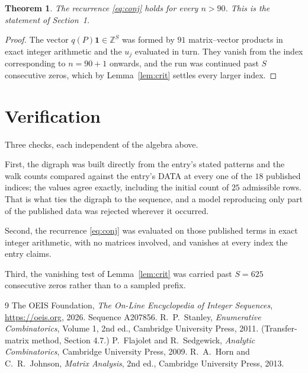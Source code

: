 \documentclass[11pt,a4paper]{article}
\theoremstyle{plain}
\newtheorem{theorem}{Theorem}
\theoremstyle{definition}
\begin{document}
\begin{theorem}
The recurrence \eqref{eq:conj} holds for every $n>90$. This is the statement of
Section~1.
\end{theorem}

\begin{proof}
The vector $q(P)\mathbf{1}\in\mathbb{Z}^{S}$ was formed by $91$ matrix--vector
products in exact integer arithmetic and the $u_j$ evaluated in turn. They vanish from the
index corresponding to $n=90+1$ onwards, and the run was continued past $S$ consecutive
zeros, which by Lemma~\ref{lem:crit} settles every larger index.
\end{proof}

\section{Verification}

Three checks, each independent of the algebra above.

First, the digraph was built directly from the entry's stated patterns and the walk counts
compared against the entry's DATA at every one of the $18$ published indices; the
values agree exactly, including the initial count of $25$ admissible rows. That is
what ties the digraph to the sequence, and a model reproducing only part of the published
data was rejected wherever it occurred.

Second, the recurrence \eqref{eq:conj} was evaluated on those published terms in exact
integer arithmetic, with no matrices involved, and vanishes at every index the entry claims.

Third, the vanishing test of Lemma~\ref{lem:crit} was carried past $S=625$ consecutive
zeros rather than to a sampled prefix.

\begin{thebibliography}{9}
 The OEIS Foundation, \emph{The On-Line Encyclopedia of Integer
Sequences}, \url{https://oeis.org}, 2026. Sequence A207856.
 R.~P.~Stanley, \emph{Enumerative Combinatorics}, Volume 1, 2nd ed.,
Cambridge University Press, 2011. (Transfer-matrix method, Section 4.7.)
 P.~Flajolet and R.~Sedgewick, \emph{Analytic Combinatorics}, Cambridge
University Press, 2009.
 R.~A.~Horn and C.~R.~Johnson, \emph{Matrix Analysis}, 2nd ed., Cambridge
University Press, 2013.
\end{thebibliography}
\end{document}
